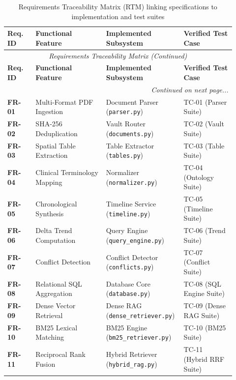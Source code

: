 \small
\begin{longtable}{@{}p{0.12\linewidth} p{0.30\linewidth} p{0.28\linewidth} p{0.22\linewidth}@{}}
\caption{Requirements Traceability Matrix (RTM) linking specifications to implementation and test suites}\label{tab:3_6_rtm} \\
\toprule
\textbf{Req. ID} & \textbf{Functional Feature} & \textbf{Implemented Subsystem} & \textbf{Verified Test Case} \\
\midrule
\endfirsthead
\toprule
\multicolumn{4}{c}{\small\textit{Requirements Traceability Matrix (Continued)}} \\[4pt]
\midrule
\textbf{Req. ID} & \textbf{Functional Feature} & \textbf{Implemented Subsystem} & \textbf{Verified Test Case} \\
\midrule
\endhead
\midrule
\multicolumn{4}{r}{\footnotesize\textit{Continued on next page...}} \\
\bottomrule
\endfoot
\bottomrule
\endlastfoot
\textbf{FR-01} & Multi-Format PDF Ingestion & Document Parser (\texttt{parser.py}) & TC-01 (Parser Suite) \\
\midrule
\textbf{FR-02} & SHA-256 Deduplication & Vault Router (\texttt{documents.py}) & TC-02 (Vault Suite) \\
\midrule
\textbf{FR-03} & Spatial Table Extraction & Table Extractor (\texttt{tables.py}) & TC-03 (Table Suite) \\
\midrule
\textbf{FR-04} & Clinical Terminology Mapping & Normalizer (\texttt{normalizer.py}) & TC-04 (Ontology Suite) \\
\midrule
\textbf{FR-05} & Chronological Synthesis & Timeline Service (\texttt{timeline.py}) & TC-05 (Timeline Suite) \\
\midrule
\textbf{FR-06} & Delta Trend Computation & Query Engine (\texttt{query\_engine.py}) & TC-06 (Trend Suite) \\
\midrule
\textbf{FR-07} & Conflict Detection & Conflict Detector (\texttt{conflicts.py}) & TC-07 (Conflict Suite) \\
\midrule
\textbf{FR-08} & Relational SQL Aggregation & Database Core (\texttt{database.py}) & TC-08 (SQL Engine Suite) \\
\midrule
\textbf{FR-09} & Dense Vector Retrieval & Dense RAG (\texttt{dense\_retriever.py}) & TC-09 (Dense RAG Suite) \\
\midrule
\textbf{FR-10} & BM25 Lexical Matching & BM25 Engine (\texttt{bm25\_retriever.py}) & TC-10 (BM25 Suite) \\
\midrule
\textbf{FR-11} & Reciprocal Rank Fusion & Hybrid Retriever (\texttt{hybrid\_rag.py}) & TC-11 (Hybrid RRF Suite) \\

\end{longtable}
